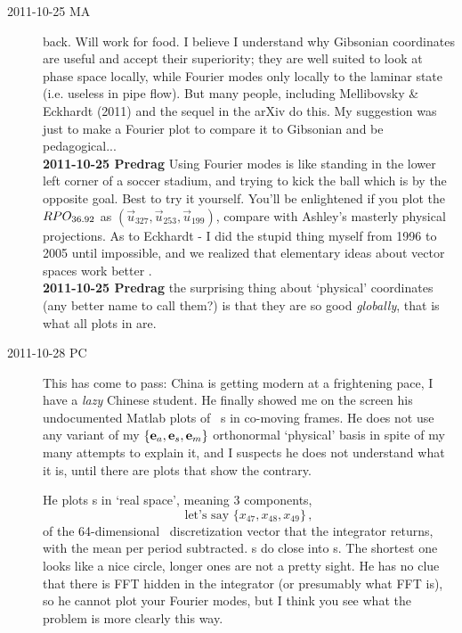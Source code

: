 \begin{description}
\item[2011-10-25 MA~~] back. Will work for food. I believe I understand
why Gibsonian coordinates are useful and accept their superiority; they
are well suited to look at phase space locally, while Fourier modes only
locally to the laminar state (i.e. useless in pipe flow). But many
people, including Mellibovsky \& Eckhardt (2011) and the sequel in the
arXiv do this. My suggestion was just to make a Fourier plot to compare
it to Gibsonian and be pedagogical...
\\
{\bf 2011-10-25 Predrag} Using Fourier modes is like standing in the
lower left corner of a soccer stadium, and trying to kick the ball which
is by the opposite goal. Best to try it yourself. You'll be enlightened
if you plot the $RPO_{36.92}$ as
$(\vec{u}_{327},\vec{u}_{253},\vec{u}_{199})$, compare with Ashley's
masterly physical projections. As to Eckhardt - I did the stupid thing
myself from 1996 to 2005  until impossible, and we
realized that elementary ideas about vector spaces work better
.
\\
{\bf 2011-10-25 Predrag} the surprising thing about `physical' coordinates
(any better name to call them?)
is that they are so good \emph{globally}, that is what all plots in
 are.


\item[2011-10-28 PC~~]
This has come to pass: China is getting modern at a frightening pace, I
have a \emph{lazy } Chinese student. He finally showed me on the screen
his undocumented Matlab plots of \KS\ \rpo s in co-moving frames. He does
not use any variant of my $\{{\bf e}_a, {\bf e}_s, {\bf e}_m\}$ orthonormal
`physical' basis  in spite of my many attempts to
explain it, and I suspects he does not understand what it is, until there
are plots that show the contrary.

\medskip

He plots \rpo s in `real space', meaning 3 components,
\[
\mbox{let's say } \{x_{47}, x_{48}, x_{49}\}
\,,
\]
of the 64-dimensional \KS\ discretization
vector that the integrator returns, with the mean {\phaseVel} per period
subtracted. \Rpo s do close into \po s. The shortest one looks like a
nice circle, longer ones are not a pretty sight. He has no clue that
there is FFT hidden in the integrator (or presumably what FFT is), so he
cannot plot your Fourier modes, but I think you see what the problem is
more clearly this way.


\end{description}
